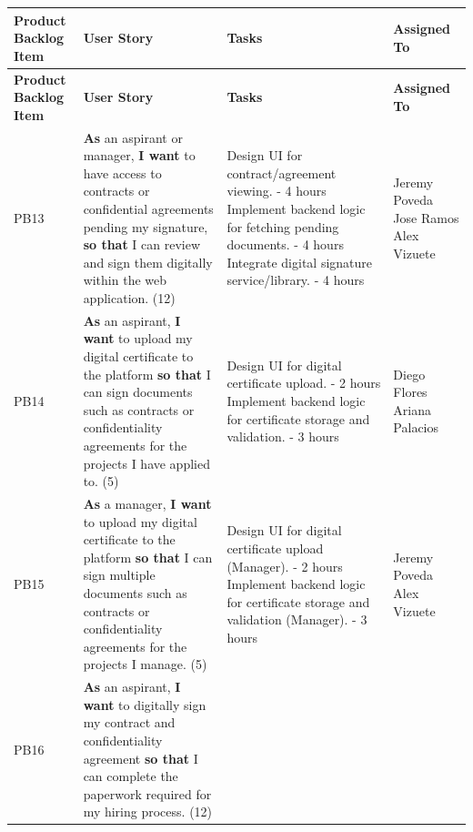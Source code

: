 \documentclass{scrreprt}
\begin{document}
\begin{longtable}{|p{1.5cm}|p{5.5cm}|p{4.5cm}|p{3cm}|} \hline
	\textbf{Product Backlog Item} & \textbf{User Story} & \textbf{Tasks} & \textbf{Assigned To} \\ \hline
	\endfirsthead
	\hline
	\textbf{Product Backlog Item} & \textbf{User Story} & \textbf{Tasks} & \textbf{Assigned To} \\ \hline
	\endhead
	
	PB13 & \textbf{As} an aspirant or manager, \textbf{I want} to have access to contracts or confidential agreements pending my signature, \textbf{so that} I can review and sign them digitally within the web application. (12) &
	
	Design UI for contract/agreement viewing. - 4 hours \newline
	Implement backend logic for fetching pending documents. - 4 hours \newline
	Integrate digital signature service/library. - 4 hours &
	Jeremy Poveda \newline
	Jose Ramos \newline
	Alex Vizuete \\ \hline
	
	PB14 & \textbf{As} an aspirant, \textbf{I want} to upload my digital certificate to the platform \textbf{so that} I can sign documents such as contracts or confidentiality agreements for the projects I have applied to. (5) &
	
	Design UI for digital certificate upload. - 2 hours \newline
	Implement backend logic for certificate storage and validation. - 3 hours &
	Diego Flores \newline
	Ariana Palacios \\ \hline
	
	PB15 & \textbf{As} a manager, \textbf{I want} to upload my digital certificate to the platform \textbf{so that} I can sign multiple documents such as contracts or confidentiality agreements for the projects I manage. (5) &
	
	Design UI for digital certificate upload (Manager). - 2 hours \newline
	Implement backend logic for certificate storage and validation (Manager). - 3 hours &
	Jeremy Poveda \newline
	Alex Vizuete \\ \hline
	
	PB16 & \textbf{As} an aspirant, \textbf{I want} to digitally sign my contract and confidentiality agreement \textbf{so that} I can complete the paperwork required for my hiring process. (12) & 
	

\end{longtable}
\end{document}
